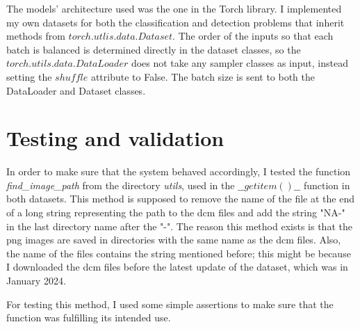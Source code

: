 The models' architecture used was the one in the Torch library. I implemented my own datasets for both the classification and detection problems that inherit methods from $torch.utlis.data.Dataset$. The order of the inputs so that each batch is balanced is determined directly in the dataset classes, so the $torch.utils.data.DataLoader$ does not take any sampler classes as input, instead setting the $shuffle$ attribute to False. The batch size is sent to both the DataLoader and Dataset classes.

\section{Testing and validation}

In order to make sure that the system behaved accordingly, I tested the function \textit{find\_image\_path} from the directory \textit{utils}, used in the $\_\_getitem()\_\_$ function in both datasets. This method is supposed to remove the name of the file at the end of a long string representing the path to the dcm files and add the string "NA-" in the last directory name after the "-". The reason this method exists is that the png images are saved in directories with the same name as the dcm files. Also, the name of the files contains the string mentioned before; this might be because I downloaded the dcm files before the latest update of the dataset, which was in January 2024.

For testing this method, I used some simple assertions to make sure that the function was fulfilling its intended use.
